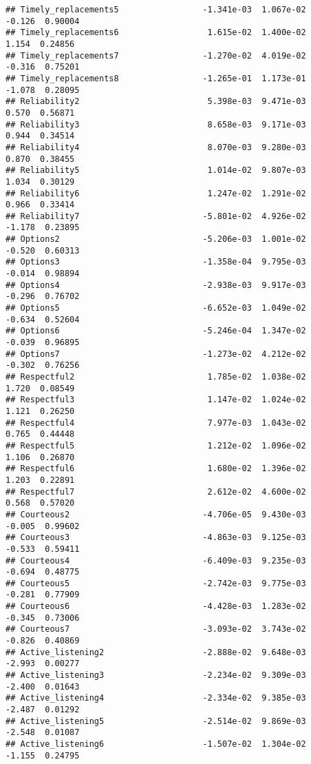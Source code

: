 \documentclass[
]{article}
\begin{document}
\begin{verbatim}
## Timely_replacements5                 -1.341e-03  1.067e-02    -0.126  0.90004
## Timely_replacements6                  1.615e-02  1.400e-02     1.154  0.24856
## Timely_replacements7                 -1.270e-02  4.019e-02    -0.316  0.75201
## Timely_replacements8                 -1.265e-01  1.173e-01    -1.078  0.28095
## Reliability2                          5.398e-03  9.471e-03     0.570  0.56871
## Reliability3                          8.658e-03  9.171e-03     0.944  0.34514
## Reliability4                          8.070e-03  9.280e-03     0.870  0.38455
## Reliability5                          1.014e-02  9.807e-03     1.034  0.30129
## Reliability6                          1.247e-02  1.291e-02     0.966  0.33414
## Reliability7                         -5.801e-02  4.926e-02    -1.178  0.23895
## Options2                             -5.206e-03  1.001e-02    -0.520  0.60313
## Options3                             -1.358e-04  9.795e-03    -0.014  0.98894
## Options4                             -2.938e-03  9.917e-03    -0.296  0.76702
## Options5                             -6.652e-03  1.049e-02    -0.634  0.52604
## Options6                             -5.246e-04  1.347e-02    -0.039  0.96895
## Options7                             -1.273e-02  4.212e-02    -0.302  0.76256
## Respectful2                           1.785e-02  1.038e-02     1.720  0.08549
## Respectful3                           1.147e-02  1.024e-02     1.121  0.26250
## Respectful4                           7.977e-03  1.043e-02     0.765  0.44448
## Respectful5                           1.212e-02  1.096e-02     1.106  0.26870
## Respectful6                           1.680e-02  1.396e-02     1.203  0.22891
## Respectful7                           2.612e-02  4.600e-02     0.568  0.57020
## Courteous2                           -4.706e-05  9.430e-03    -0.005  0.99602
## Courteous3                           -4.863e-03  9.125e-03    -0.533  0.59411
## Courteous4                           -6.409e-03  9.235e-03    -0.694  0.48775
## Courteous5                           -2.742e-03  9.775e-03    -0.281  0.77909
## Courteous6                           -4.428e-03  1.283e-02    -0.345  0.73006
## Courteous7                           -3.093e-02  3.743e-02    -0.826  0.40869
## Active_listening2                    -2.888e-02  9.648e-03    -2.993  0.00277
## Active_listening3                    -2.234e-02  9.309e-03    -2.400  0.01643
## Active_listening4                    -2.334e-02  9.385e-03    -2.487  0.01292
## Active_listening5                    -2.514e-02  9.869e-03    -2.548  0.01087
## Active_listening6                    -1.507e-02  1.304e-02    -1.155  0.24795

\end{verbatim}
\end{document}
